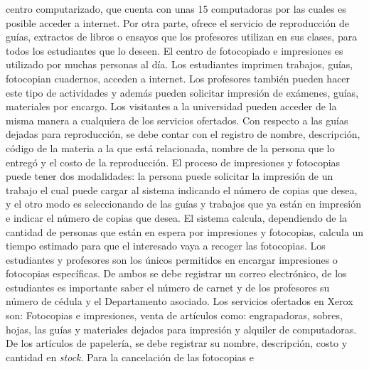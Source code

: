 \documentclass[12pt,a4paper,spanish]{article}
\begin{document}
centro computarizado, que cuenta con unas 15 computadoras por las
cuales es posible acceder a internet. Por otra parte, ofrece el
servicio de reproducci\'on de gu\'ias, extractos de libros o ensayos
que los profesores utilizan en sus clases, para todos los estudiantes
que lo deseen.
\newline
\newline
\indent El centro de fotocopiado e impresiones es utilizado por muchas
personas al d\'ia. Los estudiantes imprimen trabajos, gu\'ias,
fotocopian cuadernos, acceden a internet. Los profesores tambi\'en
pueden hacer este tipo de actividades y adem\'as pueden solicitar
impresi\'on de ex\'amenes, gu\'ias, materiales por encargo. Los
visitantes a la universidad pueden acceder de la misma manera a
cualquiera de los servicios ofertados.
\newline
\newline
\indent Con respecto a las gu\'ias dejadas para reproducci\'on, se debe contar
con el registro de nombre, descripci\'on, c\'odigo de la materia a la que est\'a
relacionada, nombre de la persona que lo entreg\'o y el costo de la
reproducci\'on. El proceso de impresiones y fotocopias puede tener dos
modalidades: la persona puede solicitar la impresi\'on de un trabajo
el cual puede cargar al sistema indicando el n\'umero de copias que
desea, y el otro modo es seleccionando de las gu\'ias y trabajos que
ya est\'an en impresi\'on e indicar el n\'umero de copias que
desea. El sistema calcula, dependiendo de la cantidad de personas que
est\'an en espera por impresiones y fotocopias, calcula un tiempo
estimado para que el interesado vaya a recoger las fotocopias.
\newline
\newline
\indent Los estudiantes y profesores son los \'unicos permitidos en
encargar impresiones o fotocopias espec\'ificas. De ambos se debe
registrar un correo electr\'onico, de los estudiantes es importante
saber el n\'umero de carnet y de los profesores su n\'umero de 
c\'edula y el Departamento asociado.
\newline
\newline
\indent Los servicios ofertados en Xerox son: Fotocopias e
impresiones, venta de art\'iculos como: engrapadoras, sobres, hojas,
las gu\'ias y materiales dejados para impresi\'on y alquiler de
computadoras. De los art\'iculos de papeler\'ia, se debe registrar su
nombre, descripci\'on, costo y cantidad en \emph{stock}.
\newline
\newline
\indent Para la cancelaci\'on de las fotocopias e
\end{document}

